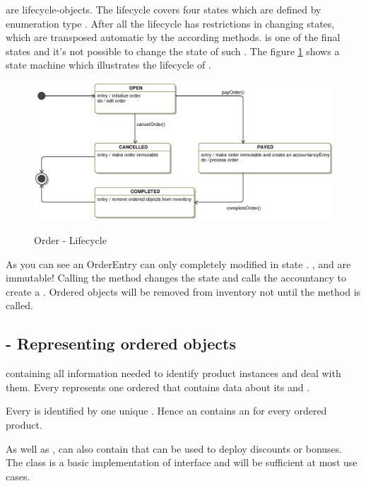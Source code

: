  are lifecycle-objects. The lifecycle covers four states which are defined by enumeration type . After all the lifecycle has restrictions in changing states, which are transposed automatic by the according methods.  is one of the final states and it's not possible to change the state of such . The figure \ref{order_statemachine} shows a state machine which illustrates the lifecycle of .

\begin{figure}[ht]
	\centering
  \includegraphics[width=1.0\textwidth]{images/Order_StateMachine.eps}
  \label{order_statemachine}
	\caption{Order - Lifecycle}
\end{figure}  

As you can see an OrderEntry can only completely modified in state . ,  and   are immutable!  Calling the  method changes the state and calls the accountancy to create a . Ordered objects will be removed from inventory not until the  method is called.  

\subsection{ - Representing ordered objects}
 containing all information needed to identify product instances and deal with them. Every  represents one ordered  that contains data about its  and . 

Every  is identified by one unique . Hence an  contains an  for every ordered product. 

As well as ,  can also contain  that can be used to deploy discounts or bonuses. The  class is a basic implementation of  interface and will be sufficient at most use cases.

